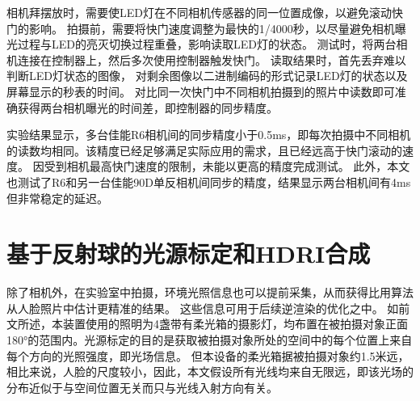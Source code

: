 相机拜摆放时，需要使LED灯在不同相机传感器的同一位置成像，以避免滚动快门的影响。
拍摄前，需要将快门速度调整为最快的1/4000秒，以尽量避免相机曝光过程与LED的亮灭切换过程重叠，影响读取LED灯的状态。
测试时，将两台相机连接在控制器上，然后多次使用控制器触发快门。
读取结果时，首先丢弃难以判断LED灯状态的图像，
对剩余图像以二进制编码的形式记录LED灯的状态以及屏幕显示的秒表的时间。
对比同一次快门中不同相机拍摄到的照片中读数即可准确获得两台相机曝光的时间差，即控制器的同步精度。

实验结果显示，多台佳能R6相机间的同步精度小于0.5ms，即每次拍摄中不同相机的读数均相同。该精度已经足够满足实际应用的需求，且已经远高于快门滚动的速度。
因受到相机最高快门速度的限制，未能以更高的精度完成测试。
此外，本文也测试了R6和另一台佳能90D单反相机间同步的精度，结果显示两台相机间有4ms但非常稳定的延迟。



\section{基于反射球的光源标定和HDRI合成}
\label{sec:light_calib}

除了相机外，在实验室中拍摄，环境光照信息也可以提前采集，从而获得比用算法从人脸照片中估计更精准的结果。
这些信息可用于后续逆渲染的优化之中。
如前文所述，本装置使用的照明为4盏带有柔光箱的摄影灯，均布置在被拍摄对象正面180°的范围内。光源标定的目的是获取被拍摄对象所处的空间中的每个位置上来自每个方向的光照强度，即光场信息。
但本设备的柔光箱据被拍摄对象约1.5米远，相比来说，人脸的尺度较小，因此，本文假设所有光线均来自无限远，即该光场的分布近似于与空间位置无关而只与光线入射方向有关。

